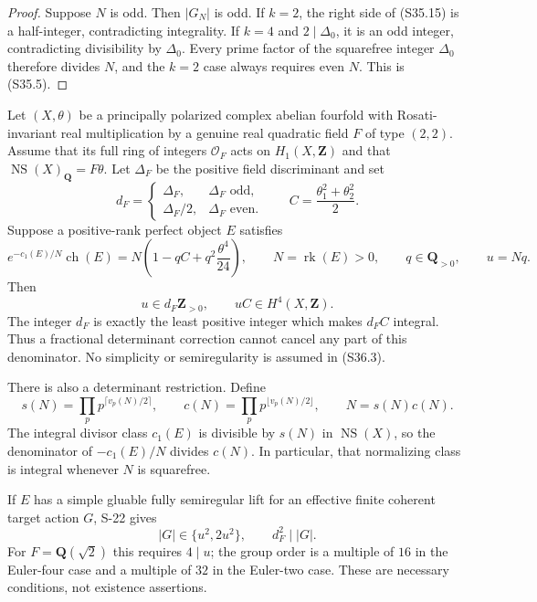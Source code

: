 \begin{proof}
Suppose \(N\) is odd. Then \(|G_N|\) is odd. If \(k=2\), the right side of (S35.15) is a half-integer, contradicting integrality. If \(k=4\) and \(2\mid\Delta_0\), it is an odd integer, contradicting divisibility by \(\Delta_0\). Every prime factor of the squarefree integer \(\Delta_0\) therefore divides \(N\), and the \(k=2\) case always requires even \(N\). This is (S35.5).
\end{proof}

\begin{theorem}
\label{thm:semireg-rm-exact-denominator}
Let $(X,\theta)$ be a principally polarized complex
abelian fourfold with Rosati-invariant real multiplication
by a genuine real quadratic field $F$ of type $(2,2)$.
Assume that its full ring of integers $\mathcal O_F$
acts on $H_1(X,\mathbf Z)$ and that
$\operatorname{NS}(X)_{\mathbf Q}=F\theta$.
Let $\Delta_F$ be the positive field discriminant and set
\[
 d_F=\begin{cases}
       \Delta_F,&\Delta_F\text{ odd},\\
       \Delta_F/2,&\Delta_F\text{ even}.
      \end{cases}
 \qquad C=\frac{\theta_1^2+\theta_2^2}{2}.
 \tag{S36.1}
\]
Suppose a positive-rank perfect object $E$ satisfies
\[
 e^{-c_1(E)/N}\operatorname{ch}(E)
       =N\left(1-qC+q^2\frac{\theta^4}{24}\right),
 \qquad N=\operatorname{rk}(E)>0,
 \qquad q\in\mathbf Q_{>0},
 \qquad u=Nq.
 \tag{S36.2}
\]
Then
\[
 u\in d_F\mathbf Z_{>0},\qquad uC\in H^4(X,\mathbf Z).
 \tag{S36.3}
\]
The integer $d_F$ is exactly the least positive integer
which makes $d_FC$ integral. Thus a fractional determinant
correction cannot cancel any part of this denominator.
No simplicity or semiregularity is assumed in (S36.3).

There is also a determinant restriction. Define
\[
 s(N)=\prod_p p^{\lceil v_p(N)/2\rceil},\qquad
 c(N)=\prod_p p^{\lfloor v_p(N)/2\rfloor},
 \qquad N=s(N)c(N).
\]
The integral divisor class $c_1(E)$ is divisible by
$s(N)$ in $\operatorname{NS}(X)$, so the denominator of
$-c_1(E)/N$ divides $c(N)$. In particular, that normalizing
class is integral whenever $N$ is squarefree.

If $E$ has a simple gluable fully semiregular lift for an
effective finite coherent target action $G$, S-22 gives
\[
 |G|\in\{u^2,2u^2\},\qquad d_F^2\mid |G|.
 \tag{S36.4}
\]
For $F=\mathbf Q(\sqrt2)$ this requires $4\mid u$;
the group order is a multiple of $16$ in the Euler-four
case and a multiple of $32$ in the Euler-two case.
These are necessary conditions, not existence assertions.
\end{theorem}
